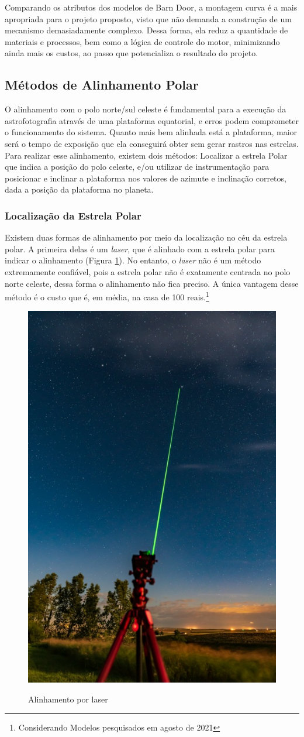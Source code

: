 Comparando os atributos dos modelos de Barn Door, a montagem curva é a mais apropriada para o projeto proposto, visto que não demanda a construção de um mecanismo demasiadamente complexo. Dessa forma, ela reduz a quantidade de materiais e processos, bem como a lógica de controle do motor, minimizando ainda mais os custos, ao passo que potencializa o resultado do projeto. 

\subsection{Métodos de Alinhamento Polar}
O alinhamento com o polo norte/sul celeste é fundamental para a execução da astrofotografia através de uma plataforma equatorial, e erros podem comprometer o funcionamento do sistema. Quanto mais bem alinhada está a plataforma, maior será o tempo de exposição que ela conseguirá obter sem gerar rastros nas estrelas. Para realizar esse alinhamento, existem dois métodos: Localizar a estrela Polar que indica a posição do polo celeste, e/ou utilizar de instrumentação para posicionar e inclinar a plataforma nos valores de azimute e inclinação corretos, dada a posição da plataforma no planeta.

\subsubsection{Localização da Estrela Polar}
Existem duas formas de alinhamento por meio da localização no céu da estrela polar. A primeira delas é um \textit{laser}, que é alinhado com a estrela polar para indicar o alinhamento (Figura \ref{fig:alinhamentolaser}). No entanto, o \textit{laser} não é um método extremamente confiável, pois a estrela polar não é exatamente centrada no polo norte celeste, dessa forma o alinhamento não fica preciso. A única vantagem desse método é o custo que é, em média, na casa de 100 reais.\footnote{Considerando Modelos pesquisados em agosto de 2021}

 \begin{figure}[!htb]
	\centering
	\caption{Alinhamento por laser}
	\includegraphics[width=0.3\linewidth]{figuras/alinhamentolaser}
	\label{fig:alinhamentolaser}
\end{figure}


